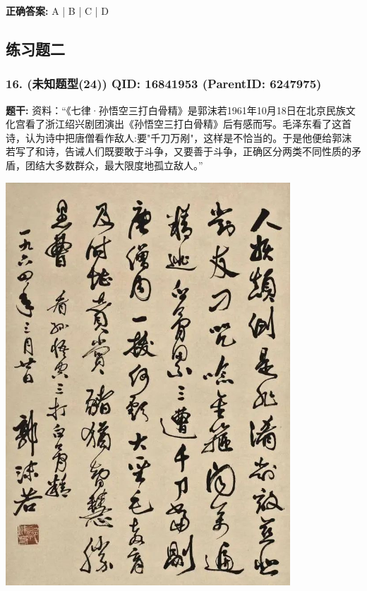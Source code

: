 \documentclass[12pt,UTF8]{ctexart}
\begin{document}
\textbf{正确答案:}
A | B | C | D

\vspace{0.3em}\hrulefill\vspace{0.7em}

\subsection*{练习题二}

\subsubsection*{16. (未知题型(24)) \small QID: 16841953 (ParentID: 6247975)}

\textbf{题干:}
资料：“《七律·孙悟空三打白骨精》是郭沫若1961年10月18日在北京民族文化宫看了浙江绍兴剧团演出《孙悟空三打白骨精》后有感而写。毛泽东看了这首诗，认为诗中把唐僧看作敌人:要"千刀万剐"，这样是不恰当的。于是他便给郭沫若写了和诗，告诫人们既要敢于斗争，又要善于斗争，正确区分两类不同性质的矛盾，团结大多数群众，最大限度地孤立敌人。”

\begin{center}\includegraphics[width=0.8\textwidth,keepaspectratio]{chapter_2551632_专题四_社会主义改造理论/unit_6247975_练习题二/question_16841953/title_img_1.png}\end{center}
\end{document}
